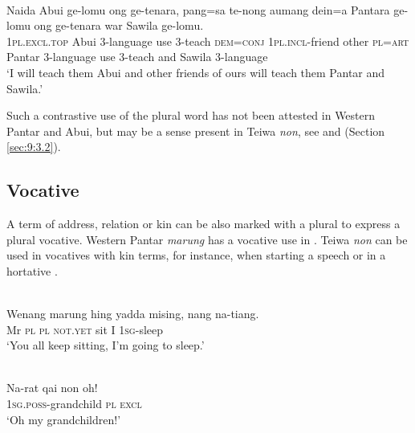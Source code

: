\ea%
\label{ex:9:87}
 \\
\gll  Naida Abui ge-lomu ong ge-tenara,  pang=sa te-nong aumang dein=a  Pantara ge-lomu ong ge-tenara war Sawila ge-lomu. \\
  \textsc{1pl.excl.top} Abui 3-language use 3-teach  \textsc{dem=conj} \textsc{1pl.incl}-friend other \textsc{pl=art}   Pantar 3-language use 3-teach and Sawila 3-language  \\
\glt `I will teach them Abui and other friends of ours  will teach them Pantar and Sawila.'
\z

Such a contrastive use of the plural word has not been attested in Western Pantar and Abui, but may be a sense present in Teiwa \textit{non}, see  and  (Section \ref{sec:9:3.2}).

\subsection{Vocative} %
\label{sec:9:4.5}
A term of address, relation or kin can be also marked with a plural to express a plural vocative. Western Pantar \textit{marung} has a vocative use in . Teiwa \textit{non} can be used in vocatives with kin terms, for instance, when starting a speech  or in a hortative .


\ea%
\label{ex:9:88}
 \\
\gll  Wenang  marung hing yadda mising, nang {na-ti}{{\textglotstop}}{ang.} \\
   Mr  \textsc{pl} \textsc{pl} \textsc{not.yet} sit I \textsc{1sg}-sleep  \\
\glt `You all keep sitting, I'm going to sleep.'
\z







\ea%
\label{ex:9:89}
 \\
\gll Na-{rat qai} non oh!  \\
  1\textsc{sg}.\textsc{poss}-grandchild \textsc{pl} \textsc{excl}   \\
\glt `Oh my grandchildren!'
\z







